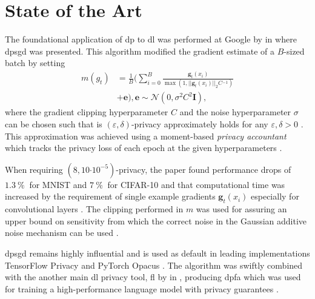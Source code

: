 \documentclass[12pt,fleqn,twocolumn]{article}
\newcommand{\pro}{\ensuremath{\:\%{}\:}}
\newcommand{\ctp}[1]{\ensuremath{\cdot10^{#1}}}
\newcommand{\reci}{\ensuremath{^{-1}}}
\begin{document}
\section*{State of the Art}%
\label{sec:State of The Art}
The foundational application of \acrshort{dp} to \acrshort{dl} was performed at Google by \textcite{abadi2016dldp} in \citeyear{abadi2016dldp} where \acrfull{dpsgd} was presented.
This algorithm modified the gradient estimate of a $B$-sized batch by setting
\begin{align*}
    m(g_t) &= \frac 1 B \Big(
        \sum_{i=0}^B \frac{\mathbf g_t(x_i)}{\operatorname{max}\left(1, || \mathbf g_t(x_i)||_2 C\reci\right)}
    \\ &+ \mathbf e \Big), \mathbf e\sim \mathcal N(0, \sigma^2C^2 \mathbf I),
\end{align*}
where the gradient clipping hyperparameter $C$ and the noise hyperparameter $\sigma$ can be chosen such that is $(\varepsilon, \delta)$-privacy approximately holds for any $\varepsilon, \delta > 0$ \cite[Ch. 3.1]{abadi2016dldp}.
This approximation was achieved using a moment-based \emph{privacy accountant} which tracks the privacy loss of each epoch at the given hyperparameters \cite[Ch. 3.2]{abadi2016dldp}.

When requiring $(8, 10\ctp{-5})$-privacy, the paper found performance drops of $1.3\pro$ for MNIST and $7\pro$ for CIFAR-10 \cite[Chap. 5.3]{abadi2016dldp} and that computational time was increased by the requirement of single example gradients $\mathbf g_t(x_i)$ especially for convolutional layers \cite[Chap. 4]{abadi2016dldp}.
The clipping performed in $m$ was used for assuring an upper bound on sensitivity from which the correct noise in the Gaussian additive noise mechanism can be used \cite[Chap. 4]{abadi2016dldp}.

\acrshort{dpsgd} remains highly influential and is used as default in leading implementations TensorFlow Privacy \cite{rade2019tensorflow} and PyTorch Opacus \cite{yousef2021opacus}.
The algorithm was swiftly combined with the another main \acrshort{dl} privacy tool, \acrfull{fl} by \textcite{mcmahan2017learningdp} in \citeyear{mcmahan2017learningdp}, producing \acrfull{dpfa} which was used for training a high-performance language model with privacy guarantees \cite[Chap. 3]{mcmahan2017learningdp}.
\end{document}
